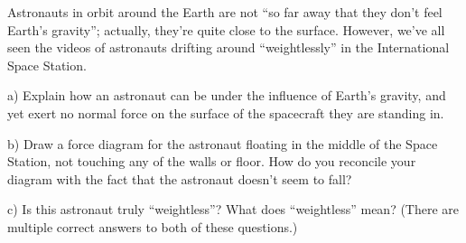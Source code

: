 \documentclass[12pt]{article}
\begin{document}
Astronauts in orbit around the Earth are not ``so far away that they don't feel Earth's gravity'';
actually, they’re quite close to the surface. However, we’ve all seen the videos of astronauts drifting
around ``weightlessly'' in the International Space Station.

a) Explain how an astronaut can be under the influence of Earth's gravity, and yet exert no normal
force on the surface of the spacecraft they are standing in.

\vspace{2in}

b) Draw a force diagram for the astronaut floating in the middle of the Space Station, not touching
any of the walls or floor. How do you reconcile your diagram with the fact that the astronaut
doesn't seem to fall?

\vspace{2in}

c) Is this astronaut truly ``weightless''? What does ``weightless'' mean? (There are multiple correct answers to both of these questions.)

\newpage
\end{document}
